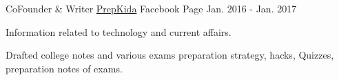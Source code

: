 

\begin{cventries}

  \cventry
    {CoFounder \& Writer} %
    {\href{http://www.facebook.com/prepkida/}{PrepKida}} %
    {Facebook Page} %
    {Jan. 2016 - Jan. 2017} %
    {
      \begin{cvitems} %
      	\item {Information related to technology and current affairs.}
        \item {Drafted college notes and various exams preparation strategy, hacks, Quizzes, preparation notes of exams.}
      \end{cvitems}
    }
\end{cventries}
